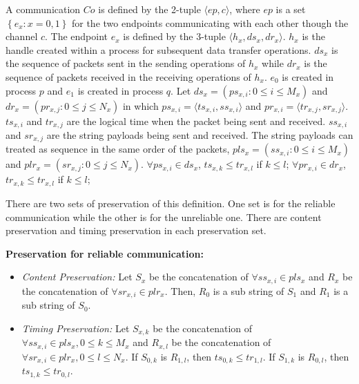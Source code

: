 A communication $Co$ is defined by the 2-tuple $\langle ep, c \rangle$, where $ep$ is a set $\left\lbrace e_{x}: x= 0,1\right\rbrace $ for the two endpoints communicating with each other though the channel $c$. The endpoint $e_{x}$ is defined by the 3-tuple $\langle h_{x}, ds_{x}, dr_{x}\rangle$. $h_{x}$ is the handle created within a process for subsequent data transfer operations. $ds_{x}$ is the sequence of packets sent in the sending operations of $h_{x}$ while $dr_{x}$ is the sequence of packets received in the receiving operations of $h_{x}$. $e_{0}$ is created in process $p$ and $e_{1}$ is created in process $q$. Let $ds_{x} = \left(ps_{x,i}: 0\leqslant i \leqslant M_{x} \right)$ and $dr_{x} = \left(pr_{x,j}: 0\leqslant j \leqslant N_{x} \right)$ in which $ps_{x,i} = \langle ts_{x,i}, ss_{x,i} \rangle$ and $pr_{x,i} = \langle tr_{x,j}, sr_{x,j} \rangle$. $ts_{x,i}$ and $tr_{x,j}$ are the logical time when the packet being sent and received. $ss_{x,i}$ and $sr_{x,j}$ are the string payloads being sent and received. The string payloads can treated as sequence in the same order of the packets, $pls_{x} = \left(ss_{x,i}: 0\leqslant i \leqslant M_{x} \right)$ and $plr_{x} = \left(sr_{x,j}: 0\leqslant j \leqslant N_{x} \right)$. $\forall ps_{x,i} \in ds_{x}$, $ts_{x,k} \leqslant tr_{x,l}$ if $k \leqslant l$; $\forall pr_{x,i} \in dr_{x}$, $tr_{x,k} \leqslant tr_{x,l}$ if $k \leqslant l$; 

There are two sets of preservation of this definition. One set is for the reliable communication while the other is for the unreliable one. There are content preservation and timing preservation in each preservation set.

\textbf{Preservation for reliable communication:}
\begin{itemize}
 \item \textit{ Content Preservation:} Let $S_{x}$ be the concatenation of $\forall ss_{x,i} \in pls_{x}$ and $R_{x}$ be the concatenation of $\forall sr_{x,i} \in plr_{x}$. Then, $R_{0}$ is a sub string of $S_{1}$ and $R_{1}$ is a sub string of $S_{0}$.
 \item \textit{Timing Preservation:} Let $S_{x,k}$ be the concatenation of $\forall ss_{x,i} \in pls_{x}, 0 \leqslant k \leqslant M_{x}$ and $R_{x,l}$ be the concatenation of $\forall sr_{x,i} \in plr_{x}, 0 \leqslant l \leqslant N_{x}$. If $S_{0,k}$ is $R_{1,l}$, then $ts_{0,k} \leqslant tr_{1,l}$. If $S_{1,k}$ is $R_{0,l}$, then $ts_{1,k} \leqslant tr_{0,l}$. 
\end{itemize}

